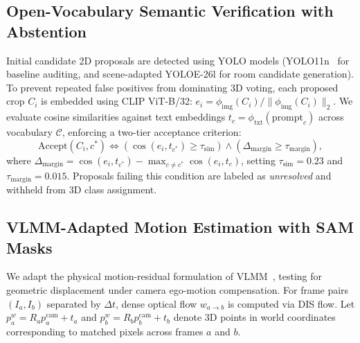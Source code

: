 \documentclass[conference]{IEEEtran}
\begin{document}
\subsection{Open-Vocabulary Semantic Verification with Abstention}
Initial candidate 2D proposals are detected using YOLO models (YOLO11n~\cite{ultralytics2024yolo} for baseline auditing, and scene-adapted YOLOE-26l for room candidate generation). To prevent repeated false positives from dominating 3D voting, each proposed crop $C_i$ is embedded using CLIP ViT-B/32: $e_i = \phi_{\mathrm{img}}(C_i) / \|\phi_{\mathrm{img}}(C_i)\|_2$. We evaluate cosine similarities against text embeddings $t_c = \phi_{\mathrm{txt}}(\text{prompt}_c)$ across vocabulary $\mathcal{C}$, enforcing a two-tier acceptance criterion:
\begin{equation}
\mathrm{Accept}(C_i, c^*) \iff (\cos(e_i, t_{c^*}) \ge \tau_{\mathrm{sim}}) \land (\Delta_{\mathrm{margin}} \ge \tau_{\mathrm{margin}}),
\end{equation}
where $\Delta_{\mathrm{margin}} = \cos(e_i, t_{c^*}) - \max_{c \ne c^*} \cos(e_i, t_c)$, setting $\tau_{\mathrm{sim}} = 0.23$ and $\tau_{\mathrm{margin}} = 0.015$. Proposals failing this condition are labeled as \textit{unresolved} and withheld from 3D class assignment.

\subsection{VLMM-Adapted Motion Estimation with SAM Masks}
\label{sec:sam_motion}
We adapt the physical motion-residual formulation of VLMM~\cite{vlmm2026}, testing for geometric displacement under camera ego-motion compensation. For frame pairs $(I_a, I_b)$ separated by $\Delta t$, dense optical flow $w_{a \to b}$ is computed via DIS flow. Let $p_a^w = R_a p_a^{\mathrm{cam}} + t_a$ and $p_b^w = R_b p_b^{\mathrm{cam}} + t_b$ denote 3D points in world coordinates corresponding to matched pixels across frames $a$ and $b$.
\end{document}
